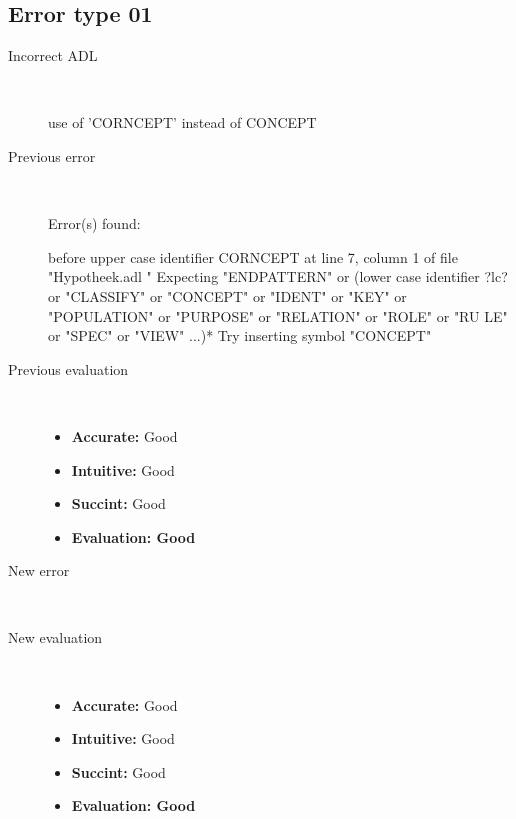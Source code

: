 \subsection{Error type 01}
  \begin{description}
  \item[Incorrect ADL]~\\
\begin{adl}
use of 'CORNCEPT' instead of CONCEPT\end{adl}
  \item[Previous error]~\\
\begin{haskell}
Error(s) found:

before upper case identifier CORNCEPT at line 7, column 1 of file "Hypotheek.adl
"
Expecting "ENDPATTERN" or (lower case identifier ?lc? or "CLASSIFY" or "CONCEPT"
 or "IDENT" or "KEY" or "POPULATION" or "PURPOSE" or "RELATION" or "ROLE" or "RU
LE" or "SPEC" or "VIEW" ...)*
Try inserting symbol "CONCEPT"\end{haskell}
  \item[Previous evaluation]~\\
    \begin{itemize}
    \item \textbf{Accurate:} Good
    \item \textbf{Intuitive:} Good
    \item \textbf{Succint:} Good
    \item \textbf{Evaluation: Good}
    \end{itemize}
  \item[New error]~\\
\begin{haskell}
\end{haskell}
  \item[New evaluation]~\\
    \begin{itemize}
    \item \textbf{Accurate:} Good
    \item \textbf{Intuitive:} Good
    \item \textbf{Succint:} Good
    \item \textbf{Evaluation: Good
}
    \end{itemize}
  \end{description}

